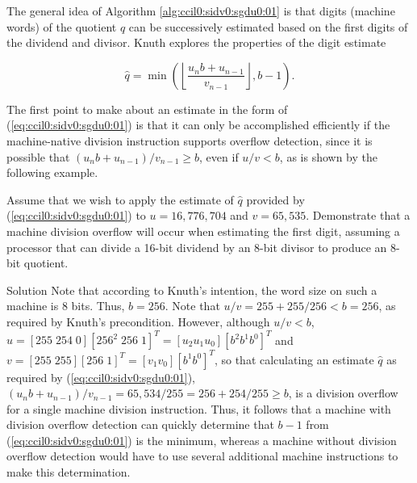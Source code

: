 \vworkalgorithmfooter{}

The general idea of Algorithm \ref{alg:ccil0:sidv0:sgdu0:01} is that 
digits (machine words) of the quotient $q$ can be successively estimated 
based on the first digits of the dividend and divisor.  Knuth
\cite[p. 271]{bibref:b:knuthclassic2ndedvol2} explores the properties of
the digit estimate 

\begin{equation}
\label{eq:ccil0:sidv0:sgdu0:01}
\hat{q} = \min \left( {\left\lfloor{\frac{u_n b + u_{n-1}}{v_{n-1}}}\right\rfloor, b-1} \right).
\end{equation}

The first point to make about an estimate in the form of 
(\ref{eq:ccil0:sidv0:sgdu0:01}) is that it can only be accomplished
efficiently if the machine-native division instruction supports
overflow detection, since it is possible that
$(u_n b + u_{n-1})/v_{n-1} \geq b$, even if 
$u/v < b$, as is shown by the following example.

\begin{vworkexamplestatement}
\label{ex:ccil0:sidv0:sgdu0:01:01}
Assume that we wish to apply the estimate of $\hat{q}$ provided by 
(\ref{eq:ccil0:sidv0:sgdu0:01})
to $u=16,776,704$ and $v=65,535$.  Demonstrate that a machine division
overflow will occur when estimating the first digit, assuming a processor
that can divide a 16-bit dividend by an 8-bit divisor to produce an 8-bit
quotient.
\end{vworkexamplestatement}
\begin{vworkexampleparsection}{Solution}
Note that according to Knuth's intention, the word size on such a machine
is 8 bits.  Thus, $b=256$.  Note that $u/v = 255 + 255/256 < b = 256$, as
required by Knuth's precondition.  However, although $u/v < b$, 
$u = [255 \; 254 \; 0] [256^2 \; 256 \; 1]^T = [u_2 u_1 u_0] [b^2 b^1 b^0]^T$ and 
$v = [255 \; 255] [256 \; 1]^T = [v_1 v_0] [b^1 b^0]^T$, so that calculating
an estimate $\hat{q}$ as required by (\ref{eq:ccil0:sidv0:sgdu0:01}),
$(u_n b + u_{n-1})/v_{n-1} = 65,534/255 = 256 + 254/255 \geq b$, is a division
overflow for a single machine division instruction.  Thus, it follows that 
a machine with division overflow detection can quickly determine that $b-1$ from
(\ref{eq:ccil0:sidv0:sgdu0:01}) is the minimum, whereas a machine without 
division overflow
detection would have to use several additional machine instructions to make
this determination.
\end{vworkexampleparsection}
\vworkexamplefooter{}

